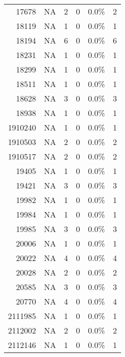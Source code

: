\begin{longtable}{lrrrrr}
	    \multicolumn{1}{r}{17678} & NA    & 2     & 0     & 0.0\% & 2 \\
	    \multicolumn{1}{r}{18119} & NA    & 1     & 0     & 0.0\% & 1 \\
	    \multicolumn{1}{r}{18194} & NA    & 6     & 0     & 0.0\% & 6 \\
	    \multicolumn{1}{r}{18231} & NA    & 1     & 0     & 0.0\% & 1 \\
	    \multicolumn{1}{r}{18299} & NA    & 1     & 0     & 0.0\% & 1 \\
	    \multicolumn{1}{r}{18511} & NA    & 1     & 0     & 0.0\% & 1 \\
	    \multicolumn{1}{r}{18628} & NA    & 3     & 0     & 0.0\% & 3 \\
	    \multicolumn{1}{r}{18938} & NA    & 1     & 0     & 0.0\% & 1 \\
	    \multicolumn{1}{r}{1910240} & NA    & 1     & 0     & 0.0\% & 1 \\
	    \multicolumn{1}{r}{1910503} & NA    & 2     & 0     & 0.0\% & 2 \\
	    \multicolumn{1}{r}{1910517} & NA    & 2     & 0     & 0.0\% & 2 \\
	    \multicolumn{1}{r}{19405} & NA    & 1     & 0     & 0.0\% & 1 \\
	    \multicolumn{1}{r}{19421} & NA    & 3     & 0     & 0.0\% & 3 \\
	    \multicolumn{1}{r}{19982} & NA    & 1     & 0     & 0.0\% & 1 \\
	    \multicolumn{1}{r}{19984} & NA    & 1     & 0     & 0.0\% & 1 \\
	    \multicolumn{1}{r}{19985} & NA    & 3     & 0     & 0.0\% & 3 \\
	    \multicolumn{1}{r}{20006} & NA    & 1     & 0     & 0.0\% & 1 \\
	    \multicolumn{1}{r}{20022} & NA    & 4     & 0     & 0.0\% & 4 \\
	    \multicolumn{1}{r}{20028} & NA    & 2     & 0     & 0.0\% & 2 \\
	    \multicolumn{1}{r}{20585} & NA    & 3     & 0     & 0.0\% & 3 \\
	    \multicolumn{1}{r}{20770} & NA    & 4     & 0     & 0.0\% & 4 \\
	    \multicolumn{1}{r}{2111985} & NA    & 1     & 0     & 0.0\% & 1 \\
	    \multicolumn{1}{r}{2112002} & NA    & 2     & 0     & 0.0\% & 2 \\
	    \multicolumn{1}{r}{2112146} & NA    & 1     & 0     & 0.0\% & 1 \\

\end{longtable}
